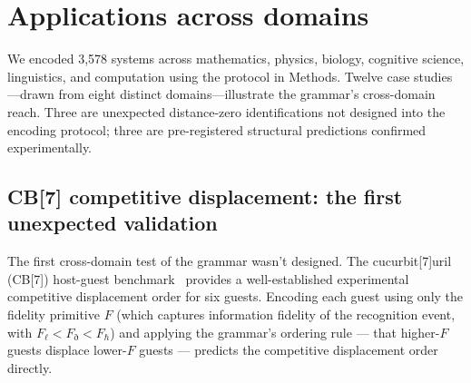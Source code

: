 \documentclass[12pt,a4paper]{article}
\begin{document}
\section{Applications across domains}
\label{sec:applications}

We encoded 3,578 systems across mathematics, physics, biology,
cognitive science, linguistics, and computation using the protocol
in Methods. Twelve case studies---drawn from eight distinct domains---illustrate
the grammar's cross-domain reach. Three are unexpected distance-zero
identifications not designed into the encoding protocol; three are
pre-registered structural predictions confirmed experimentally.

\subsection{CB[7] competitive displacement: the first unexpected validation}
\label{sec:cb7}

The first cross-domain test of the grammar wasn't designed. The
cucurbit[7]uril (CB[7]) host-guest benchmark~\cite{kim2001,assaf2015}
provides a well-established experimental competitive displacement order
for six guests. Encoding each guest using only the fidelity primitive
$F$ (which captures information fidelity of the recognition event, with
$F_\ell < F_\eth < F_\hbar$) and applying the grammar's ordering rule
--- that higher-$F$ guests displace lower-$F$ guests --- predicts the
competitive displacement order directly.
\end{document}
